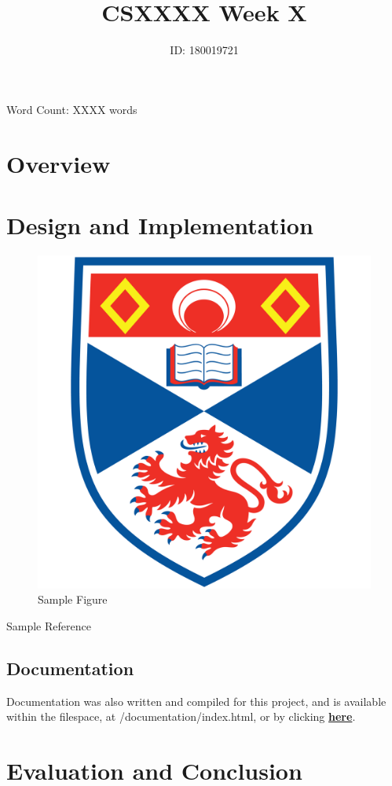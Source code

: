 \documentclass[hidelinks, a4paper]{article}
\title{CSXXXX Week X}
\author{ID: 180019721}
\begin{document}
 
\maketitle
\begin{center}
Word Count: XXXX words
\end{center}
\tableofcontents

\newpage

\section{Overview}

\section{Design and Implementation}

\begin{figure}[H]
\centering
\includegraphics[scale=0.05]{Sample.png}
\caption{Sample Figure}
\label{fig:image1}
\end{figure}

Sample Reference\cite{1}

\subsection{Documentation}
Documentation was also written and compiled for this project, and is available within the filespace, at /documentation/index.html, or by clicking \href{run:./documentation/index.html}{\textbf{here}}.

\section{Evaluation and Conclusion}

\newpage

\nocite{*}



\listoffigures
\end{document}
